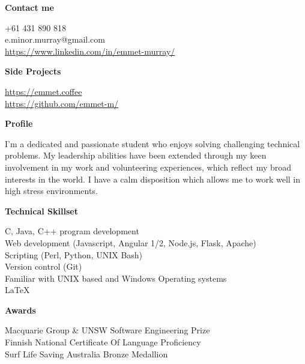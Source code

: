 \documentclass{article}
\newcommand{\mytitle}[1]{{\Large \textbf{#1}} \vspace{0.2cm}}
\begin{document}
\begin{minipage}[t]{0.3\linewidth}
    \vspace{0.2cm}
    {
        \mytitle{Contact me}
        
        +61 431 890 818 \\
        e.minor.murray@gmail.com \\
        \href{https://emmet.coffe://www.linkedin.com/in/emmet-murray/}{https://www.linkedin.com/in/emmet-murray/} \\

    }
    \vspace{0.2cm}
    {
        \mytitle{Side Projects}
        
        \href{https://emmet.coffee}{https://emmet.coffee} \\
        \href{https://github.com/emmet-m/}{https://github.com/emmet-m/} \\
        
    }
    \vspace{0.3cm}
    {
        \mytitle{Profile}
        
        I'm a dedicated and passionate student who enjoys solving challenging technical problems.
        My leadership abilities have been extended through my keen involvement in my work and volunteering experiences, which reflect my broad interests in the world.
        I have a calm disposition which allows me to work well in high stress environments. \\
    }
    \vspace{0.3cm}
    
    {
        \mytitle{Technical Skillset}

        C, Java, C++ program development \\ 

        Web development (Javascript, Angular 1/2, Node.js, Flask, Apache) \\

        Scripting (Perl, Python, UNIX Bash) \\

        Version control (Git) \\

        Familiar with UNIX based and Windows Operating systems \\

        {\large \LaTeX}
    }

    \vspace{0.5cm}

    {
        \mytitle{Awards}

        Macquarie Group \& UNSW Software Engineering Prize \\

        Finnish National Certificate Of Language Proficiency \\

        Surf Life Saving Australia Bronze Medallion
    }
%
%
\end{minipage}
%
\end{document}
